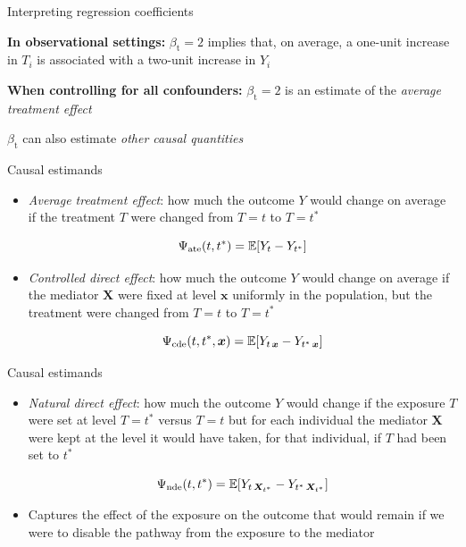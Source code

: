 \documentclass{beamer}
\theoremstyle{remark}
\newcommand{\x}{\bm x}
\newcommand{\X}{\bm X}
\newcommand{\ate}{\Psi_\text{ate} \paren*{t, t^*}}
\newcommand{\cde}{\Psi_\text{cde} \paren*{t, t^*, \x}}
\newcommand{\nde}{\Psi_\text{nde} \paren*{t, t^*}}
\DeclarePairedDelimiter{\paren}{(}{)}
\DeclarePairedDelimiter{\brac}{[}{]}
\newcommand{\E}[2][]{%
   \ifthenelse{ \equal{#1}{} }
      {\ensuremath{\mathbb{E} \brac*{#2}}}
      {\ensuremath{\mathbb{E} \brac*{#2 \mid #1}}}
}
\begin{document}
\begin{frame}{Interpreting regression coefficients}

    \textbf{In observational settings:} $\beta_\text{t} = 2$ implies that, on average, a one-unit increase in $T_i$ is associated with a two-unit increase in $Y_i$

    \textbf{When controlling for all confounders:} $\beta_\text{t} = 2$ is an estimate of the \emph{average treatment effect}

    $\beta_\text{t}$ can also estimate \emph{other causal quantities} \citep{vanderweele_explanation_2015}

\end{frame}

\begin{frame}{Causal estimands}

    \begin{itemize}
        \item \emph{Average treatment effect}: how much the outcome $Y$ would change on average if the treatment $T$ were changed from $T = t$ to $T = t^*$

              \begin{equation*}
                  \ate = \E{Y_t - Y_{t^*}}
              \end{equation*}

        \item \emph{Controlled direct effect}: how much the outcome $Y$ would change on average if the mediator $\X$ were fixed at level $\x$ uniformly in the population, but the treatment were changed from $T = t$ to $T = t^*$

              \begin{equation*}
                  \cde = \E{Y_{t \, \x} - Y_{t^* \, \x}}
              \end{equation*}

    \end{itemize}

\end{frame}

\begin{frame}{Causal estimands}

    \begin{itemize}
        \item \emph{Natural direct effect}: how much the outcome $Y$ would change if the exposure $T$ were set at level $T = t^*$ versus $T = t$ but for each individual the mediator $\X$ were kept at the level it would have taken, for that individual, if $T$ had been set to $t^*$

              \begin{equation*}
                  \nde = \E{Y_{t \, \X_{t^*}} - Y_{t^* \, \X_{t^*}}}
              \end{equation*}

        \item Captures the effect of the exposure on the outcome that would remain if we were to disable the pathway from the exposure to the mediator

    \end{itemize}

\end{frame}
\end{document}

